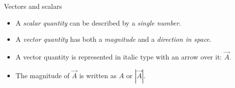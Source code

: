 \documentclass[18pt]{LectMechanics}
\begin{document}
\begin{frame}{Vectors and scalars}{}
	\begin{itemize}
		\item A \emph{scalar quantity} can be described by a \textit{single number}.
		\item A \emph{vector quantity} has both a \textit{magnitude} and a
		      \textit{direction in space}.
		\item A vector quantity is represented in italic type with an arrow over it:
		      $\vec A$.
		\item The magnitude of $\vec A$ is written as $A$ or $|\vec A|$.
	\end{itemize}
\end{frame}
\end{document}
